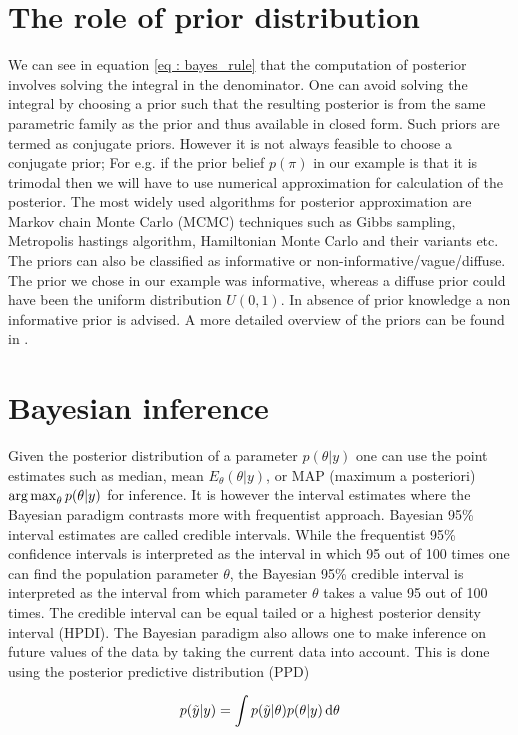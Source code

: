 \section{The role of prior distribution}
We can see in equation \ref{eq : bayes_rule} that the computation of posterior involves solving the integral in the denominator. One can avoid solving the integral by choosing a prior such that the resulting posterior is from the same parametric family as the prior and thus available in closed form. Such priors are termed as conjugate priors. However it is not always feasible to choose a conjugate prior; For e.g. if the prior belief $p(\pi)$ in our example is that it is trimodal then we will have to use numerical approximation for calculation of the posterior. The most widely used algorithms for posterior approximation are Markov chain Monte Carlo (MCMC) techniques such as Gibbs sampling, Metropolis hastings algorithm, Hamiltonian Monte Carlo and their variants etc. The priors can also be classified as informative or non-informative/vague/diffuse. The prior we chose in our example was informative, whereas a diffuse prior could have been the uniform distribution $U(0,1)$. In absence of prior knowledge a non informative prior is advised. A more detailed overview of the priors can be found in \citet{lesaffre_bayesian_2012}.

\section{Bayesian inference}
Given the posterior distribution of a parameter $p(\theta|y)$ one can use the point estimates such as median, mean $E_\theta(\theta|y)$, or MAP (maximum a posteriori) $\operatorname*{arg\,max}_\theta p(\theta|y)$ for inference. It is however the interval estimates where the Bayesian paradigm contrasts more with frequentist approach. Bayesian 95\% interval estimates are called credible intervals. While the frequentist 95\% confidence intervals is interpreted as the interval in which 95 out of 100 times one can find the population parameter $\theta$, the Bayesian 95\% credible interval is interpreted as the interval from which parameter $\theta$ takes a value 95 out of 100 times. The credible interval can be equal tailed or a highest posterior density interval (HPDI). The Bayesian paradigm also allows one to make inference on future values of the data by taking the current data into account. This is done using the posterior predictive distribution (PPD)

$$p(\tilde{y}|y) = \int p(\tilde{y}|\theta) p(\theta|y) \mathop{}\!\mathrm{d}\theta$$


